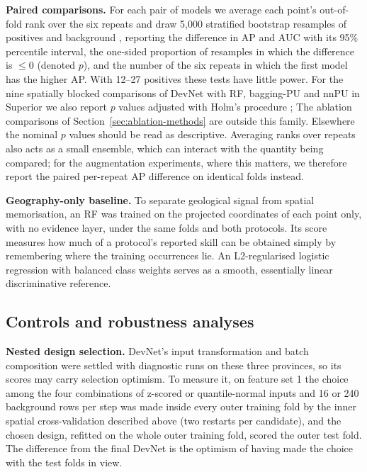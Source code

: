 \documentclass[pdflatex,sn-apa]{sn-jnl}
\begin{document}
\textbf{Paired comparisons.} For each pair of models we average each point's out-of-fold rank over the six repeats and draw 5,000 stratified bootstrap resamples of positives and background \citep{Efron1993}, reporting the difference in AP and AUC with its 95\% percentile interval, the one-sided proportion of resamples in which the difference is $\leq 0$ (denoted $p$), and the number of the six repeats in which the first model has the higher AP. With 12--27 positives these tests have little power. For the nine spatially blocked comparisons of DevNet with RF, bagging-PU and nnPU in Superior we also report $p$ values adjusted with Holm's procedure \citep{Holm1979}; The ablation comparisons of Section~\ref{sec:ablation-methods} are outside this family. Elsewhere the nominal $p$ values should be read as descriptive. Averaging ranks over repeats also acts as a small ensemble, which can interact with the quantity being compared; for the augmentation experiments, where this matters, we therefore report the paired per-repeat AP difference on identical folds instead.

\textbf{Geography-only baseline.} To separate geological signal from spatial memorisation, an RF was trained on the projected coordinates of each point only, with no evidence layer, under the same folds and both protocols. Its score measures how much of a protocol's reported skill can be obtained simply by remembering where the training occurrences lie. An L2-regularised logistic regression with balanced class weights serves as a smooth, essentially linear discriminative reference.

\subsection{Controls and robustness analyses}\label{sec:robust-methods}

\textbf{Nested design selection.} DevNet's input transformation and batch composition were settled with diagnostic runs on these three provinces, so its scores may carry selection optimism. To measure it, on feature set 1 the choice among the four combinations of z-scored or quantile-normal inputs and 16 or 240 background rows per step was made inside every outer training fold by the inner spatial cross-validation described above (two restarts per candidate), and the chosen design, refitted on the whole outer training fold, scored the outer test fold. The difference from the final DevNet is the optimism of having made the choice with the test folds in view.
\end{document}
